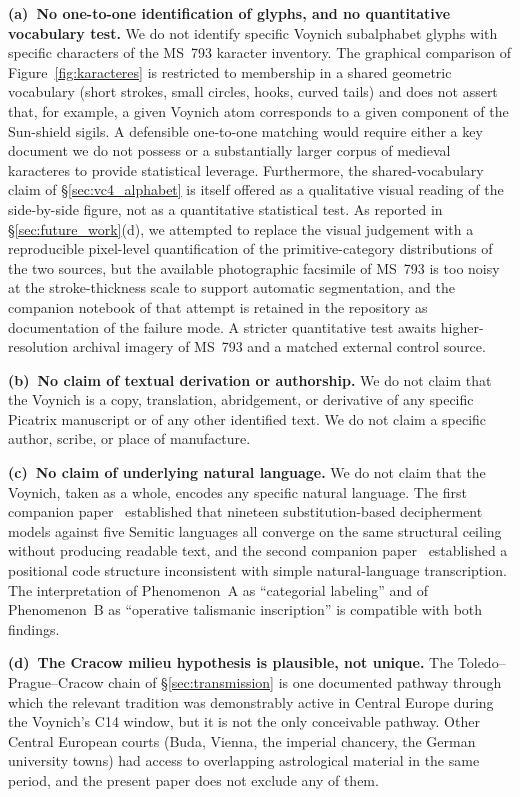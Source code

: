 \noindent\textbf{(a)~No one-to-one identification of glyphs, and no
quantitative vocabulary test.} We do not identify specific Voynich
subalphabet glyphs with specific characters of the MS~793 karacter
inventory. The graphical comparison of Figure~\ref{fig:karacteres} is
restricted to membership in a shared geometric vocabulary (short
strokes, small circles, hooks, curved tails) and does not assert that,
for example, a given Voynich atom corresponds to a given component of
the Sun-shield sigils. A defensible one-to-one matching would require
either a key document we do not possess or a substantially larger
corpus of medieval karacteres to provide statistical leverage.
Furthermore, the shared-vocabulary claim of \S\ref{sec:vc4_alphabet}
is itself offered as a qualitative visual reading of the side-by-side
figure, not as a quantitative statistical test. As reported in
\S\ref{sec:future_work}(d), we attempted to replace the visual
judgement with a reproducible pixel-level quantification of the
primitive-category distributions of the two sources, but the
available photographic facsimile of MS~793 is too noisy at the
stroke-thickness scale to support automatic segmentation, and the
companion notebook of that attempt is retained in the repository as
documentation of the failure mode. A stricter quantitative test
awaits higher-resolution archival imagery of MS~793 and a matched
external control source.

\noindent\textbf{(b)~No claim of textual derivation or authorship.} We
do not claim that the Voynich is a copy, translation, abridgement, or
derivative of any specific Picatrix manuscript or of any other
identified text. We do not claim a specific author, scribe, or place
of manufacture.

\noindent\textbf{(c)~No claim of underlying natural language.} We do
not claim that the Voynich, taken as a whole, encodes any specific
natural language. The first companion paper~\citep{jimenez2026negative}
established that nineteen substitution-based decipherment models
against five Semitic languages all converge on the same structural
ceiling without producing readable text, and the second companion
paper~\citep{jimenez2026twotier} established a positional code
structure inconsistent with simple natural-language transcription.
The interpretation of Phenomenon~A as ``categorial labeling'' and of
Phenomenon~B as ``operative talismanic inscription'' is compatible
with both findings.

\noindent\textbf{(d)~The Cracow milieu hypothesis is plausible, not
unique.} The Toledo--Prague--Cracow chain of \S\ref{sec:transmission}
is one documented pathway through which the relevant tradition was
demonstrably active in Central Europe during the Voynich's C14 window,
but it is not the only conceivable pathway. Other Central European
courts (Buda, Vienna, the imperial chancery, the German university
towns) had access to overlapping astrological material in the same
period, and the present paper does not exclude any of them.

